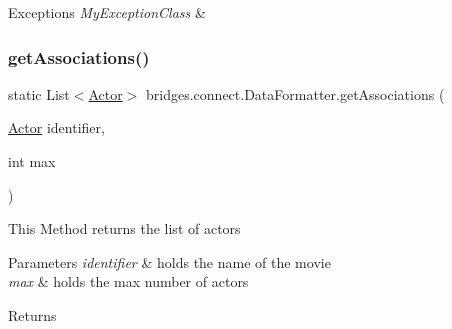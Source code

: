 \begin{DoxyExceptions}{Exceptions}
{\em My\+Exception\+Class} & \\
\hline
\end{DoxyExceptions}
\hypertarget{classbridges_1_1connect_1_1_data_formatter_a5e9f400a020b99e0bbba1fd5332a8f88}{}\label{classbridges_1_1connect_1_1_data_formatter_a5e9f400a020b99e0bbba1fd5332a8f88} 
\subsubsection{\texorpdfstring{get\+Associations()}{getAssociations()}\hspace{0.1cm}{\footnotesize\ttfamily [4/5]}}
{\footnotesize\ttfamily static List$<$\hyperlink{classbridges_1_1data__src__dependent_1_1_actor}{Actor}$>$ bridges.\+connect.\+Data\+Formatter.\+get\+Associations (\begin{DoxyParamCaption}\item[{\hyperlink{classbridges_1_1data__src__dependent_1_1_actor}{Actor}}]{identifier,  }\item[{int}]{max }\end{DoxyParamCaption})\hspace{0.3cm}{\ttfamily [static]}}

This Method returns the list of actors 
\begin{DoxyParams}{Parameters}
{\em identifier} & holds the name of the movie \\
\hline
{\em max} & holds the max number of actors \\
\hline
\end{DoxyParams}
\begin{DoxyReturn}{Returns}

\end{DoxyReturn}
\hypertarget{classbridges_1_1connect_1_1_data_formatter_ad0377b692c07836fb1016e5fb296e79c}{}\label{classbridges_1_1connect_1_1_data_formatter_ad0377b692c07836fb1016e5fb296e79c} 
